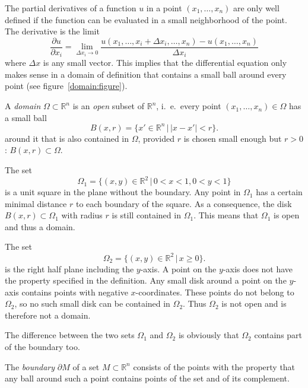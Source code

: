 The partial derivatives of a function $u$ in a point $(x_1,\dots,x_n)$
are only well defined if the function can be evaluated in a small 
neighborhood of the point.
The derivative is the limit
\[
\frac{\partial u}{\partial x_i}=
\lim_{\Delta x_i\to 0}\frac{u(x_1,\dots,x_i+\Delta x_i, \dots ,x_n)-u(x_1,\dots,x_n)}{\Delta x_i}
\]
where $\Delta x$ is any small vector.
This implies that the differential equation only makes sense in a
domain of definition that contains a small ball around every point
(see figure~\ref{domain:figure}).

\begin{definition}
\label{definition:domain}
A {\em domain}
$\Omega\subset \mathbb R^n$ is an {\em open} subset of
$\mathbb R^n$, i.~e.~every point 
$(x_1,\dots,x_n)\in\Omega$
has a small ball
\[
B(x, r)=\{x'\in\mathbb R^n\,|\,|x-x'|<r\}.
\]
around it that is also contained in $\Omega$, provided $r$ is chosen
small enough but $r>0$:
$B(x,r)\subset\Omega$.
\end{definition}

\begin{beispiel}
The set
\[
\Omega_1=\{ (x,y)\in\mathbb R^2\,|\, 0 < x < 1, 0<y<1\}
\]
is a unit square in the plane without the boundary.
Any point in $\Omega_1$ has a certain minimal distance $r$ to each
boundary of the square.
As a consequence, the disk 
$B(x,r)\subset\Omega_1$ with radius $r$ is still contained in $\Omega_1$.
This means that $\Omega_1$ is open and thus a domain.
\end{beispiel}

\begin{beispiel}
The set
\[
\Omega_2 = \{ (x,y)\in\mathbb R^2\,|\, x\ge 0\}.
\]
is the right half plane including the $y$-axis.
A point on the $y$-axis does not have the property specified in the
definition.
Any small disk around a point on the $y$-axis contains points with negative
$x$-coordinates.
These points do not belong to $\Omega_2$, so no such small disk can be
contained in $\Omega_2$.
Thus $\Omega_2$ is not open and is therefore not a domain.
\end{beispiel}

The difference between the two sets $\Omega_1$ and $\Omega_2$ is
obviously that $\Omega_2$ contains part of the boundary too.

\begin{definition}
\label{definition:boundary}
The {\em boundary} $\partial M$ of a set $M\subset\mathbb R^n$
consists of the points with the property that
any ball around such a point contains points of the set and of its
complement.
\end{definition}

